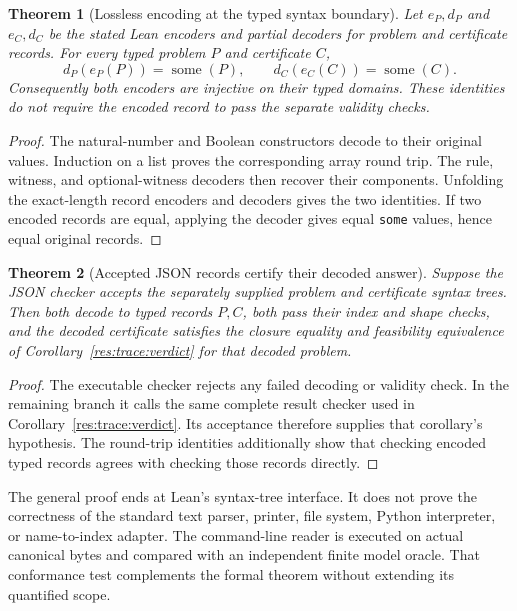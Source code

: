 \documentclass[11pt,oneside]{article}
\theoremstyle{komorebiplain}
\newtheorem{theorem}{Theorem}[section]
\theoremstyle{komorebidefinition}
\theoremstyle{komorebiremark}
\begin{document}
\begin{theorem}[Lossless encoding at the typed syntax boundary]
\label{res:trace:codec}
Let $e_P,d_P$ and $e_C,d_C$ be the stated Lean encoders and partial decoders for problem and certificate records. For every typed problem $P$ and certificate $C$,
\[
 d_P(e_P(P))=\operatorname{some}(P),\qquad
 d_C(e_C(C))=\operatorname{some}(C).
\]
Consequently both encoders are injective on their typed domains. These identities do not require the encoded record to pass the separate validity checks.
\end{theorem}
\begin{proof}
The natural-number and Boolean constructors decode to their original values. Induction on a list proves the corresponding array round trip. The rule, witness, and optional-witness decoders then recover their components. Unfolding the exact-length record encoders and decoders gives the two identities. If two encoded records are equal, applying the decoder gives equal \texttt{some} values, hence equal original records.
\end{proof}

\begin{theorem}[Accepted JSON records certify their decoded answer]
\label{res:trace:json}
Suppose the JSON checker accepts the separately supplied problem and certificate syntax trees. Then both decode to typed records $P,C$, both pass their index and shape checks, and the decoded certificate satisfies the closure equality and feasibility equivalence of Corollary~\ref{res:trace:verdict} for that decoded problem.
\end{theorem}
\begin{proof}
The executable checker rejects any failed decoding or validity check. In the remaining branch it calls the same complete result checker used in Corollary~\ref{res:trace:verdict}. Its acceptance therefore supplies that corollary's hypothesis. The round-trip identities additionally show that checking encoded typed records agrees with checking those records directly.
\end{proof}

The general proof ends at Lean's  syntax-tree interface. It does not prove the correctness of the standard text parser, printer, file system, Python interpreter, or name-to-index adapter. The command-line reader is executed on actual canonical bytes and compared with an independent finite model oracle. That conformance test complements the formal theorem without extending its quantified scope.
\end{document}

